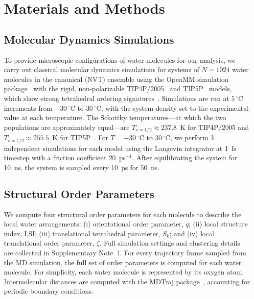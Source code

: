\documentclass[aps, amsmath,amssymb, reprint, twocolumn, superscriptaddress]{revtex4-2}
\begin{document}
\FloatBarrier


\section{Materials and Methods}

\subsection{Molecular Dynamics Simulations}
To provide microscopic configurations of water molecules for our analysis, we carry out classical molecular dynamics simulations for systems of $N = 1024$ water molecules in the canonical (NVT) ensemble using the OpenMM simulation package~\cite{eastman_openmm_2015} with the rigid, non-polarizable TIP4P/2005~\cite{abascal_general_2005} and TIP5P~\cite{mahoney_five-site_2000} models, which show strong tetrahedral ordering signatures~\cite{shi_direct_2020}. Simulations are run at $5\,^\circ$C increments from $-30\,^\circ$C to $30\,^\circ$C, with the system density set to the experimental value at each temperature. The Schottky temperatures---at which the two populations are approximately equal---are $T_{s=1/2} \approx 237.8$~K for TIP4P/2005 and $T_{s=1/2} \approx 255.5$~K for TIP5P~\cite{shi_direct_2020}. For $T=-30\,^\circ$C to $30\,^\circ$C, we perform 3 independent simulations for each model using the Langevin integrator at 1~fs timestep with a friction coefficient 20~ps$^{-1}$. After equilibrating the system for 10~ns, the system is sampled every 10~ps for 50~ns. 

\subsection{Structural Order Parameters}
\label{sec:structural_order_parameter}
We compute four structural order parameters for each molecule to describe the local water arrangements: (i) orientational order parameter, $q$; (ii) local structure index, LSI; (iii) translational tetrahedral parameter, $S_k$; and (iv) local translational order parameter, $\zeta$. Full simulation settings and clustering details are collected in Supplementary Note~1. For every trajectory frame sampled from the MD simulation, the full set of order parameters is computed for each water molecule. For simplicity, each water molecule is represented by its oxygen atom. Intermolecular distances are computed with the MDTraj package~\cite{mcgibbon_mdtraj_2015}, accounting for periodic boundary conditions.
\end{document}
